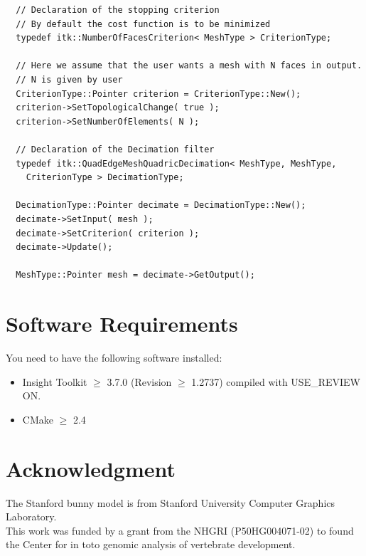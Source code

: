 \documentclass{InsightArticle}
\theoremstyle{plain}
\begin{document}
\begin{verbatim}
  // Declaration of the stopping criterion
  // By default the cost function is to be minimized
  typedef itk::NumberOfFacesCriterion< MeshType > CriterionType;

  // Here we assume that the user wants a mesh with N faces in output.
  // N is given by user
  CriterionType::Pointer criterion = CriterionType::New();
  criterion->SetTopologicalChange( true );
  criterion->SetNumberOfElements( N );

  // Declaration of the Decimation filter
  typedef itk::QuadEdgeMeshQuadricDecimation< MeshType, MeshType,
    CriterionType > DecimationType;

  DecimationType::Pointer decimate = DecimationType::New();
  decimate->SetInput( mesh );
  decimate->SetCriterion( criterion );
  decimate->Update();

  MeshType::Pointer mesh = decimate->GetOutput();
\end{verbatim}

\section{Software Requirements}

You need to have the following software installed:

\begin{itemize}
  \item Insight Toolkit $\geq$ 3.7.0 (Revision $\geq$ 1.2737) compiled with USE\_REVIEW ON.
  \item CMake $\geq$ 2.4
\end{itemize}

\section*{Acknowledgment}
The Stanford bunny model is from Stanford University Computer Graphics Laboratory.\\

This work was funded by a grant from the NHGRI (P50HG004071-02) to found the Center for in toto genomic analysis of vertebrate development.

%
%



\end{document}
